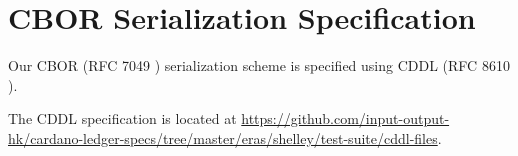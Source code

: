 \section{CBOR Serialization Specification}
\label{sec:cddl}

Our CBOR (RFC 7049 \cite{rfcCBOR})
serialization scheme is specified using
CDDL (RFC 8610 \cite{rfcCDDL}).

The CDDL specification is located at
\url{https://github.com/input-output-hk/cardano-ledger-specs/tree/master/eras/shelley/test-suite/cddl-files}.

% 
